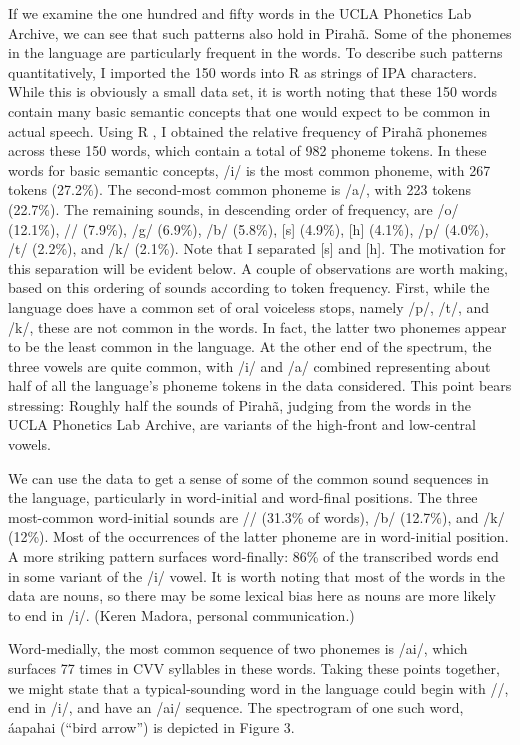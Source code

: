 \documentclass[output=paper,colorlinks,citecolor=brown
]{langscibook}
\begin{document}
    If we examine the one hundred and fifty words in the UCLA Phonetics Lab Archive, we can see that such patterns also hold in Pirahã. Some of the phonemes in the language are particularly frequent in the words. To describe such patterns quantitatively, I imported the 150 words into R as strings of IPA characters. While this is obviously a small data set, it is worth noting that these 150 words contain many basic semantic concepts that one would expect to be common in actual speech. Using R \cite{venables2003r}, I obtained the relative frequency of Pirahã phonemes across these 150 words, which contain a total of 982 phoneme tokens. In these words for basic semantic concepts, /i/ is the most common phoneme, with 267 tokens (27.2\%). The second-most common phoneme is /a/, with 223 tokens (22.7\%). The remaining sounds, in descending order of frequency, are /o/ (12.1\%), // (7.9\%), /g/ (6.9\%), /b/ (5.8\%), [s] (4.9\%), [h] (4.1\%), /p/ (4.0\%), /t/ (2.2\%), and /k/ (2.1\%). Note that I separated [s] and [h]. The motivation for this separation will be evident below. A couple of observations are worth making, based on this ordering of sounds according to token frequency. First, while the language does have a common set of oral voiceless stops, namely /p/, /t/, and /k/, these are not common in the words. In fact, the latter two phonemes appear to be the least common in the language. At the other end of the spectrum, the three vowels are quite common, with /i/ and /a/ combined representing about half of all the language’s phoneme tokens in the data considered. This point bears stressing: Roughly half the sounds of Pirahã, judging from the words in the UCLA Phonetics Lab Archive, are variants of the high-front and low-central vowels. 

    We can use the data to get a sense of some of the common sound sequences in the language, particularly in word-initial and word-final positions. The three most-common word-initial sounds are // (31.3\% of words), /b/ (12.7\%), and /k/ (12\%). Most of the occurrences of the latter phoneme are in word-initial position. A more striking pattern surfaces word-finally: 86\% of the transcribed words end in some variant of the /i/ vowel. It is worth noting that most of the words in the data are nouns, so there may be some lexical bias here as nouns are more likely to end in /i/. (Keren Madora, personal communication.) 

    Word-medially, the most common sequence of two phonemes is /ai/, which surfaces 77 times in CVV syllables in these words. Taking these points together, we might state that a typical-sounding word in the language could begin with //, end in /i/, and have an /ai/ sequence. The spectrogram of one such word, áapahai (“bird arrow”) is depicted in Figure 3.
\end{document}
